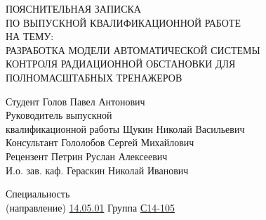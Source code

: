 \begin{center}
	\large
	\hfill \break \hfill \break \hfill \break \hfill \break
	ПОЯСНИТЕЛЬНАЯ ЗАПИСКА\\ ПО ВЫПУСКНОЙ КВАЛИФИКАЦИОННОЙ РАБОТЕ\\ НА ТЕМУ:\\[1.5cm]

	\normalsize
	РАЗРАБОТКА МОДЕЛИ АВТОМАТИЧЕСКОЙ СИСТЕМЫ \\ КОНТРОЛЯ РАДИАЦИОННОЙ ОБСТАНОВКИ ДЛЯ \\ПОЛНОМАСШТАБНЫХ ТРЕНАЖЕРОВ\\[6.0cm]
\end{center}

\noindent
\small
Студент \hspace{4.2cm} \underline{\hspace{4.2cm}} \hspace{0.7cm} Голов Павел Антонович\\

\noindent
Руководитель выпускной\\ квалификационной работы \hspace{0.85cm} \underline{\hspace{4.2cm}} \hspace{0.7cm} Щукин Николай Васильевич\\

\noindent
Консультант \hspace{3.35cm} \underline{\hspace{4.2cm}} \hspace{0.7cm} Гололобов Сергей Михайлович\\

\noindent
Рецензент \hspace{3.85cm} \underline{\hspace{4.2cm}} \hspace{0.7cm} Петрин Руслан Алексеевич\\

\noindent
И.о. зав. каф. \hspace{3.25cm} \underline{\hspace{4.2cm}} \hspace{0.7cm} Гераскин Николай Иванович\\[0.6cm]

\clearpage

\normalsize
\noindent
Специальность\\ (направление) \underline{14.05.01} \hspace{4.0cm} Группа \underline{С14-105}

